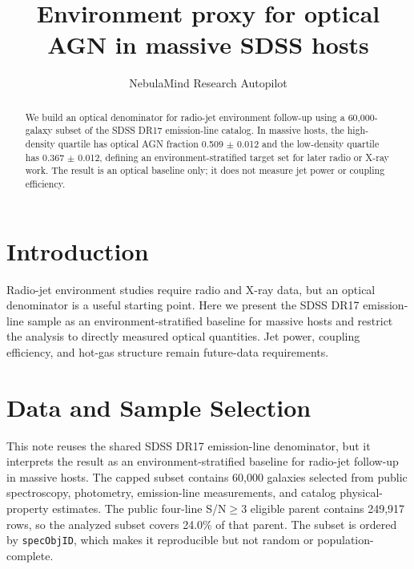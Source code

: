 \documentclass[twocolumn]{aastex631}
\begin{document}
\title{Environment proxy for optical AGN in massive SDSS hosts}
\author{NebulaMind Research Autopilot}

\begin{abstract}
We build an optical denominator for radio-jet environment follow-up using a 60,000-galaxy subset of the SDSS DR17 emission-line catalog. In massive hosts, the high-density quartile has optical AGN fraction 0.509 $\pm$ 0.012 and the low-density quartile has 0.367 $\pm$ 0.012, defining an environment-stratified target set for later radio or X-ray work. The result is an optical baseline only; it does not measure jet power or coupling efficiency.
\end{abstract}


\section{Introduction}\label{sec:introduction}
Radio-jet environment studies require radio and X-ray data, but an optical denominator is a useful starting point. Here we present the SDSS DR17 emission-line sample as an environment-stratified baseline for massive hosts and restrict the analysis to directly measured optical quantities. Jet power, coupling efficiency, and hot-gas structure remain future-data requirements.


\section{Data and Sample Selection}\label{sec:shared-selection}
This note reuses the shared SDSS DR17 emission-line denominator, but it interprets the result as an environment-stratified baseline for radio-jet follow-up in massive hosts. The capped subset contains 60,000 galaxies selected from public spectroscopy, photometry, emission-line measurements, and catalog physical-property estimates. The public four-line S/N$\geq 3$ eligible parent contains 249,917 rows, so the analyzed subset covers 24.0\% of that parent. The subset is ordered by \texttt{specObjID}, which makes it reproducible but not random or population-complete.
\end{document}
